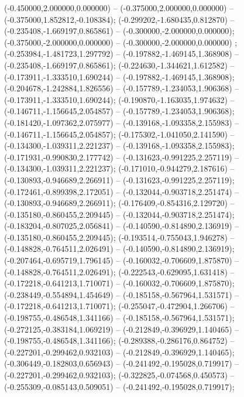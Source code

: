  (-0.450000,2.000000,0.000000) -- (-0.375000,2.000000,0.000000) -- (-0.375000,1.852812,-0.108384);
 (-0.299202,-1.680435,0.812870) -- (-0.235408,-1.669197,0.865861) -- (-0.300000,-2.000000,0.000000);
 (-0.375000,-2.000000,0.000000) -- (-0.300000,-2.000000,0.000000) ;
 (-0.253984,-1.481723,1.297792) -- (-0.197882,-1.469145,1.368908) -- (-0.235408,-1.669197,0.865861);
 (-0.224630,-1.344621,1.612582) -- (-0.173911,-1.333510,1.690244) -- (-0.197882,-1.469145,1.368908);
 (-0.204678,-1.242884,1.826556) -- (-0.157789,-1.234053,1.906368) -- (-0.173911,-1.333510,1.690244);
 (-0.190870,-1.163035,1.974632) -- (-0.146711,-1.156645,2.054857) -- (-0.157789,-1.234053,1.906368);
 (-0.181420,-1.097362,2.075977) -- (-0.139168,-1.093358,2.155983) -- (-0.146711,-1.156645,2.054857);
 (-0.175302,-1.041050,2.141590) -- (-0.134300,-1.039311,2.221237) -- (-0.139168,-1.093358,2.155983);
 (-0.171931,-0.990830,2.177742) -- (-0.131623,-0.991225,2.257119) -- (-0.134300,-1.039311,2.221237);
 (-0.171010,-0.944279,2.187616) -- (-0.130893,-0.946689,2.266911) -- (-0.131623,-0.991225,2.257119);
 (-0.172461,-0.899398,2.172051) -- (-0.132044,-0.903718,2.251474) -- (-0.130893,-0.946689,2.266911);
 (-0.176409,-0.854316,2.129720) -- (-0.135180,-0.860455,2.209445) -- (-0.132044,-0.903718,2.251474);
 (-0.183204,-0.807025,2.056841) -- (-0.140590,-0.814890,2.136919) -- (-0.135180,-0.860455,2.209445);
 (-0.193514,-0.755043,1.946278) -- (-0.148828,-0.764511,2.026491) -- (-0.140590,-0.814890,2.136919);
 (-0.207464,-0.695719,1.796145) -- (-0.160032,-0.706609,1.875870) -- (-0.148828,-0.764511,2.026491);
 (-0.222543,-0.629095,1.631418) -- (-0.172218,-0.641213,1.710071) -- (-0.160032,-0.706609,1.875870);
 (-0.238449,-0.554894,1.454649) -- (-0.185158,-0.567964,1.531571) -- (-0.172218,-0.641213,1.710071);
 (-0.255047,-0.472904,1.266706) -- (-0.198755,-0.486548,1.341166) -- (-0.185158,-0.567964,1.531571);
 (-0.272125,-0.383184,1.069219) -- (-0.212849,-0.396929,1.140465) -- (-0.198755,-0.486548,1.341166);
 (-0.289388,-0.286176,0.864752) -- (-0.227201,-0.299462,0.932103) -- (-0.212849,-0.396929,1.140465);
 (-0.306449,-0.182803,0.656943) -- (-0.241492,-0.195028,0.719917) -- (-0.227201,-0.299462,0.932103);
 (-0.322825,-0.074568,0.450573) -- (-0.255309,-0.085143,0.509051) -- (-0.241492,-0.195028,0.719917);
